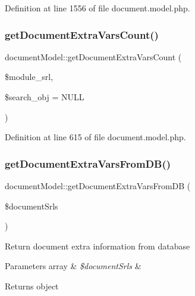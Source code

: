 Definition at line 1556 of file document.\+model.\+php.

\hypertarget{classdocumentModel_a91d03a635279fda1053a111ce13414b7}{}\label{classdocumentModel_a91d03a635279fda1053a111ce13414b7} 
\subsubsection{\texorpdfstring{get\+Document\+Extra\+Vars\+Count()}{getDocumentExtraVarsCount()}}
{\footnotesize\ttfamily document\+Model\+::get\+Document\+Extra\+Vars\+Count (\begin{DoxyParamCaption}\item[{}]{\$module\+\_\+srl,  }\item[{}]{\$search\+\_\+obj = {\ttfamily NULL} }\end{DoxyParamCaption})}



Definition at line 615 of file document.\+model.\+php.

\hypertarget{classdocumentModel_a10167011009da59ed649022e7ec42a39}{}\label{classdocumentModel_a10167011009da59ed649022e7ec42a39} 
\subsubsection{\texorpdfstring{get\+Document\+Extra\+Vars\+From\+D\+B()}{getDocumentExtraVarsFromDB()}}
{\footnotesize\ttfamily document\+Model\+::get\+Document\+Extra\+Vars\+From\+DB (\begin{DoxyParamCaption}\item[{}]{\$document\+Srls }\end{DoxyParamCaption})}

Return document extra information from database 
\begin{DoxyParams}[1]{Parameters}
array & {\em \$document\+Srls} & \\
\hline
\end{DoxyParams}
\begin{DoxyReturn}{Returns}
object 
\end{DoxyReturn}


